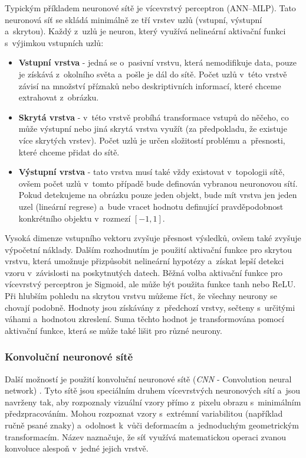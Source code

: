 Typickým příkladem neuronové sítě je vícevrstvý perceptron (ANN--MLP). Tato neuronová síť se skládá minimálně ze tří vrstev uzlů (vstupní, výstupní a~skrytou). Každý z~uzlů je neuron, který využívá nelineární aktivační funkci s~výjimkou vstupních uzlů:
\begin{itemize}
  \item{\textbf{Vstupní vrstva} - jedná se o~pasivní vrstvu, která nemodifikuje data, pouze je získává z~okolního světa a~pošle je dál do sítě. Počet uzlů v~této vrstvě závisí na množství příznaků nebo deskriptivních informací, které chceme extrahovat z~obrázku.}
  \item{\textbf{Skrytá vrstva} - v~této vrstvě probíhá transformace vstupů do něčeho, co může výstupní nebo jiná skrytá vrstva využít (za předpokladu, že existuje více skrytých vrstev). Počet uzlů je určen složitostí problému a~přesnosti, které chceme přidat do sítě.}
  \item{\textbf{Výstupní vrstva} - tato vrstva musí také vždy existovat v~topologii sítě, ovšem počet uzlů v~tomto případě bude definován vybranou neuronovou sítí. Pokud detekujeme na obrázku pouze jeden objekt, bude mít vrstva jen jeden uzel (lineární regrese) a~bude vracet hodnotu definující pravděpodobnost konkrétního objektu v~rozmezí $[-1,1]$.}
\end{itemize}

Vysoká dimenze vstupního vektoru zvyšuje přesnost výsledků, ovšem také zvyšuje výpočetní náklady. Dalším rozhodnutím je použití aktivační funkce pro skrytou vrstvu, která umožnuje přizpůsobit nelineární hypotézy a~získat lepší detekci vzoru v~závislosti na poskytnutých datech. Běžná volba aktivační funkce pro vícevrstvý perceptron je Sigmoid, ale může být použita funkce tanh nebo ReLU. Při hlubším pohledu na skrytou vrstvu můžeme říct, že všechny neurony se chovají podobně. Hodnoty jsou získávány z~předchozí vrstvy, sečteny s~určitými váhami a~hodnotou zkreslení.
Suma těchto hodnot je transformována pomocí aktivační funkce, která se může také lišit pro různé neurony.


\subsubsection*{Konvoluční neuronové sítě}
Další možností je použití konvoluční neuronové sítě (\textit{CNN} - Convolution neural network) \cite{lenet}. Tyto sítě jsou speciálním druhem vícevrstvých neuronových sítí a~jsou navrženy tak, aby rozpoznaly vizuální vzory přímo z~pixelu obrazu s~minimálním předzpracováním. Mohou rozpoznat vzory s~extrémní variabilitou (například ručně psané znaky) a~odolnost k~vůči deformacím a~jednoduchým geometrickým transformacím. Název  naznačuje, že síť využívá matematickou operaci zvanou konvoluce alespoň v~jedné jejich vrstvě.

